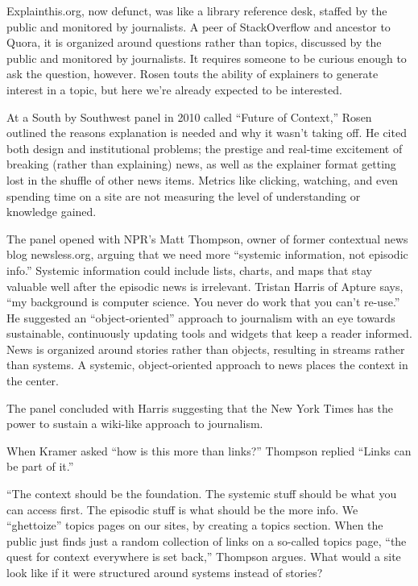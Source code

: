 Explainthis.org, now defunct, was like a library reference desk, staffed by the public and monitored by journalists. A peer of StackOverflow and ancestor to Quora, it is organized around questions rather than topics, discussed by the public and monitored by journalists. It requires someone to be curious enough to ask the question, however. Rosen touts the ability of explainers to generate interest in a topic, but here we're already expected to be interested.

At a South by Southwest panel in 2010 called ``Future of Context,'' Rosen outlined the reasons explanation is needed and why it wasn't taking off. He cited both design and institutional problems; the prestige and real-time excitement of breaking (rather than explaining) news, as well as the explainer format getting lost in the shuffle of other news items.\autocite{rosen_2010} Metrics like clicking, watching, and even spending time on a site are not measuring the level of understanding or knowledge gained.

The panel opened with NPR's Matt Thompson, owner of former contextual news blog newsless.org, arguing that we need more ``systemic information, not episodic info.'' Systemic information could include lists, charts, and maps that stay valuable well after the episodic news is irrelevant. Tristan Harris of Apture says, ``my background is computer science. You never do work that you can't re-use.'' He suggested an ``object-oriented'' approach to journalism with an eye towards sustainable, continuously updating tools and widgets that keep a reader informed. News is organized around stories rather than objects, resulting in streams rather than systems. A systemic, object-oriented approach to news places the context in the center.

The panel concluded with Harris suggesting that the New York Times has the power to sustain a wiki-like approach to journalism.

When Kramer asked ``how is this more than links?'' Thompson replied ``Links can be part of it.''


``The context should be the foundation. The systemic stuff should be what you can access first. The episodic stuff is what should be the more info. We “ghettoize” topics pages on our sites, by creating a topics section. When the public just finds just a random collection of links on a so-called topics page, “the quest for context everywhere is set back,” Thompson argues. What would a site look like if it were structured around systems instead of stories?

